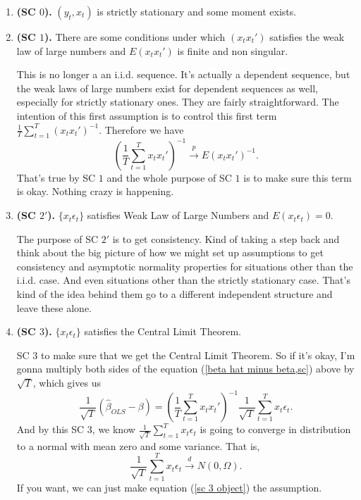 \documentclass[11pt,a4paper]{amsart}
\theoremstyle{plain}
\theoremstyle{definition}
\begin{document}
   	 	 	 \begin{enumerate}
   	 	 	 	\item \textbf{(SC $0$).} $(y_{t},x_{t})$ is strictly stationary and some moment exists.
   	 	 	 	\item \textbf{(SC $1$).} There are some conditions under which $(x_{t}x_{t}')$ satisfies the weak law of large numbers and $E(x_{t}x_{t}')$ is finite and non singular.\par 
   	 	 	 	This is no longer a an i.i.d. sequence. It's actually a dependent sequence, but the weak laws of large numbers exist for dependent sequences as well, especially for strictly stationary ones. They are fairly straightforward.  The intention of this first assumption is to control this first term $\frac{1}{T}\sum_{t=1}^{T}(x_{t}x_{t}')^{-1}$. Therefore we have 
   	 	 	 	\[	(\frac{1}{T}\sum_{t=1}^{T}x_{t}x_{t}')^{-1} \stackrel{p}{\longrightarrow} E(x_{t}x_{t}')^{-1}.	\]
   	 	 	 That's true by SC $1$ and the whole purpose of SC $1$ is to make sure this term is okay. Nothing crazy is happening. 
   	 	 	 	\item \textbf{(SC $2'$).} $\{x_{t}\epsilon_{t}\}$ satisfies Weak Law of Large Numbers and $E(x_{t}\epsilon_{t}) = 0$.\par 
   	 	 	 	The purpose of SC $2'$ is to get consistency. Kind of taking a step back and think about the big picture of how we might set up assumptions to get consistency and asymptotic normality properties for situations other than the i.i.d. case. And even situations other than the strictly stationary case. That's kind of the idea behind them go to a different independent structure and leave these alone. 
   	 	 	 	\item \textbf{(SC $3$).} $\{x_{t}\epsilon_{t}\}$ satisfies the Central Limit Theorem. \par 
   	 	 	 	SC $3$ to make sure that we get the Central Limit Theorem. So if it's okay, I'm gonna multiply both  sides of the equation (\ref{beta hat minus beta,sc}) above by $\sqrt{T}$, which gives us 
   	 	 	 	\begin{equation}\label{sc, sqrt T}
   	 	 	 	\frac{1}{\sqrt{T}}(\hat{\beta}_{OLS} - \beta) = (\frac{1}{T}\sum_{t=1}^{T}x_{t}x_{t}')^{-1} \frac{1}{\sqrt{T}}\sum_{t=1}^{T}x_{t}\epsilon_{t}.
   	 	 	 	\end{equation}
   	 	 	 	And by this SC $3$, we know $\frac{1}{\sqrt{T}}\sum_{t=1}^{T}x_{t}\epsilon_{t}$ is going to converge in distribution to a normal with mean zero and some variance. That is, 
   	 	 	 	\begin{equation}\label{sc 3 object}
   	 	 	 	\frac{1}{\sqrt{T}}\sum_{t=1}^{T}x_{t}\epsilon_{t} \stackrel{d}{\longrightarrow} N(0, \Omega).
   	 	 	 	\end{equation}
   	 	 	 	If you want, we can just make equation (\ref{sc 3 object}) the assumption.
   	 	 	 \end{enumerate}
    	 	 
\end{document}
